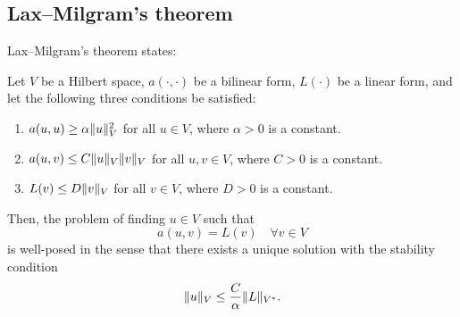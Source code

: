 \subsection{Lax--Milgram's theorem} %
Lax--Milgram's theorem states: %
\begin{theorem}
    Let $V$ be a Hilbert space, $a(\cdot, \cdot)$ be a bilinear form, $L(\cdot)$ be a linear form, and let the following three conditions be satisfied:
    \begin{enumerate}
        \item $a(u, u) \geq \alpha \lVert u\rVert_V^2$ for all $u \in V$, where $\alpha > 0$ is a constant.

        \item $a(u, v) \leq C \lVert u\rVert_V \lVert v\rVert_V$ for all $u, v \in V$, where $C > 0$ is a constant.

        \item $L(v) \leq D \lVert v\rVert_V$ for all $v \in V$, where $D > 0$ is a constant.
    \end{enumerate}
    Then, the problem of finding $u \in V$ such that
    \begin{equation}
        a(u, v) = L(v) \quad \forall v \in V
    \end{equation}
    is well-posed in the sense that there exists a unique solution with the stability condition
    \begin{equation}
        \lVert u\rVert_V \leq \frac{C}{\alpha} \lVert L\rVert_{V^*}.
    \end{equation}
\end{theorem}

